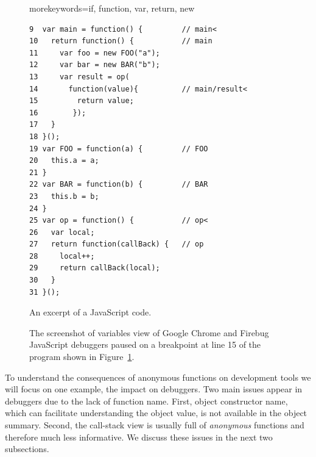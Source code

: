 \documentclass[10pt, preprint]{sigplanconf}
\begin{document}
\begin{figure}[htp]

\lstset{basicstyle=\scriptsize}
{morekeywords={if, function, var, return, new}}

\begin{lstlisting}[frame=single, language=myLang]
9  var main = function() {         // main<
10   return function() {           // main
11     var foo = new FOO("a");
12     var bar = new BAR("b");
13     var result = op(
14       function(value){          // main/result<
15         return value;
16        });
17   }
18 }();
19 var FOO = function(a) {         // FOO
20   this.a = a;
21 }
22 var BAR = function(b) {         // BAR
23   this.b = b;
24 }
25 var op = function() {           // op<
26   var local;
27   return function(callBack) {   // op
28     local++;
29     return callBack(local);
30   }
31 }();
\end{lstlisting}
\caption{An excerpt of a JavaScript code.}
\label{js-code}
\end{figure}


\begin{figure}[htp]
\centerline{
\hfil
{}}
\caption{The screenshot of variables view of Google Chrome and Firebug JavaScript debuggers paused on a breakpoint at line 15 of the program shown in Figure~\ref{js-code}.}
\label{debuggers-objects}
\end{figure}

To understand the consequences of anonymous functions on development tools we will focus on one example, the impact on debuggers.
Two main issues appear in debuggers due to the lack of function name. First, object constructor name, which can facilitate understanding the object value, is not available in the object summary. Second, the call-stack view is usually full of \textit{anonymous} functions and therefore much less informative. We discuss these issues in the next two subsections. 
 
\end{document}
